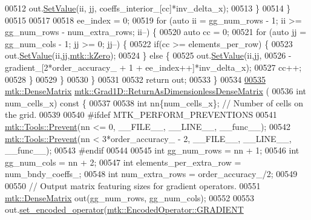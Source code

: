 \begin{DoxyCode}
{{00512       out.\hyperlink{classmtk_1_1DenseMatrix_a784ce5784109ac86bfb9d8562b334b13}{SetValue}(ii, jj, coeffs\_interior\_[cc]*inv\_delta\_x);
00513     \}
00514   \}
00515 
00517 
00518   ee\_index = 0;
00519   \textcolor{keywordflow}{for} (\textcolor{keyword}{auto} ii = gg\_num\_rows - 1; ii >= gg\_num\_rows - num\_extra\_rows; ii--) \{
00520     \textcolor{keyword}{auto} cc = 0;
00521     \textcolor{keywordflow}{for} (\textcolor{keyword}{auto} jj = gg\_num\_cols - 1; jj >= 0; jj--) \{
00522       \textcolor{keywordflow}{if}(cc >= elements\_per\_row) \{
00523         out.\hyperlink{classmtk_1_1DenseMatrix_a784ce5784109ac86bfb9d8562b334b13}{SetValue}(ii,jj,\hyperlink{group__c01-roots_ga59a451a5fae30d59649bcda274fea271}{mtk::kZero});
00524       \} \textcolor{keywordflow}{else} \{
00525         out.\hyperlink{classmtk_1_1DenseMatrix_a784ce5784109ac86bfb9d8562b334b13}{SetValue}(ii,jj,
00526                     -gradient\_[2*order\_accuracy\_ + 1 + ee\_index++]*inv\_delta\_x);
00527         cc++;
00528       \}
00529      \}
00530   \}
00531 
00532   \textcolor{keywordflow}{return} out;
00533 \}
00534 
\hypertarget{mtk__grad__1d_8cc_source_l00535}{}\hyperlink{classmtk_1_1Grad1D_ab07e6a15edca32534ae3d1a8ccaf1c42}{00535} \hyperlink{classmtk_1_1DenseMatrix}{mtk::DenseMatrix} \hyperlink{classmtk_1_1Grad1D_ab07e6a15edca32534ae3d1a8ccaf1c42}{mtk::Grad1D::ReturnAsDimensionlessDenseMatrix}
      (
00536   \textcolor{keywordtype}{int} num\_cells\_x)\textcolor{keyword}{ const }\{
00537 
00538   \textcolor{keywordtype}{int} nn\{num\_cells\_x\}; \textcolor{comment}{// Number of cells on the grid.}
00539 
00540 \textcolor{preprocessor}{  #ifdef MTK\_PERFORM\_PREVENTIONS}
00541   \hyperlink{classmtk_1_1Tools_a332324c6f25e66be9dff48c5987a3b9f}{mtk::Tools::Prevent}(nn <= 0, \_\_FILE\_\_, \_\_LINE\_\_, \_\_func\_\_);
00542   \hyperlink{classmtk_1_1Tools_a332324c6f25e66be9dff48c5987a3b9f}{mtk::Tools::Prevent}(nn < 3*order\_accuracy\_ - 2, \_\_FILE\_\_, \_\_LINE\_\_, \_\_func\_\_);
00543 \textcolor{preprocessor}{  #endif}
00544 
00545   \textcolor{keywordtype}{int} gg\_num\_rows = nn + 1;
00546   \textcolor{keywordtype}{int} gg\_num\_cols = nn + 2;
00547   \textcolor{keywordtype}{int} elements\_per\_extra\_row = num\_bndy\_coeffs\_;
00548   \textcolor{keywordtype}{int} num\_extra\_rows = order\_accuracy\_/2;
00549 
00550   \textcolor{comment}{// Output matrix featuring sizes for gradient operators.}
00551   \hyperlink{classmtk_1_1DenseMatrix}{mtk::DenseMatrix} out(gg\_num\_rows, gg\_num\_cols);
00552 
00553   out.\hyperlink{classmtk_1_1DenseMatrix_ac0f824b0fec88c4fb42e77b7550fb0d3}{set\_encoded\_operator}(\hyperlink{namespacemtk_ga9b50023bfb2692219d2915feade94f80a90f70ea2675c36bd9b0b44a79f37a41f}{mtk::EncodedOperator::GRADIENT}
}}
\end{DoxyCode}
